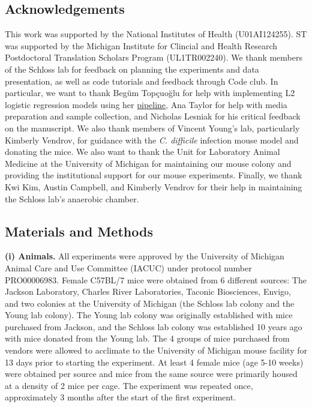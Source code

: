 \documentclass[11pt,]{article}
\begin{document}
\newpage

\subsection{Acknowledgements}\label{acknowledgements}

This work was supported by the National Institutes of Health
(U01AI124255). ST was supported by the Michigan Institute for Clincial
and Health Research Postdoctoral Translation Scholars Program
(UL1TR002240). We thank members of the Schloss lab for feedback on
planning the experiments and data presentation, as well as code
tutorials and feedback through Code club. In particular, we want to
thank Begüm Topçuoğlu for help with implementing L2 logistic regression
models using her
\href{https://github.com/SchlossLab/ML_pipeline_microbiome}{pipeline},
Ana Taylor for help with media preparation and sample collection, and
Nicholas Lesniak for his critical feedback on the manuscript. We also
thank members of Vincent Young's lab, particularly Kimberly Vendrov, for
guidance with the \emph{C. difficile} infection mouse model and donating
the mice. We also want to thank the Unit for Laboratory Animal Medicine
at the University of Michigan for maintaining our mouse colony and
providing the institutional support for our mouse experiments. Finally,
we thank Kwi Kim, Austin Campbell, and Kimberly Vendrov for their help
in maintaining the Schloss lab's anaerobic chamber.

\newpage

\subsection{Materials and Methods}\label{materials-and-methods}

\textbf{(i) Animals.} All experiments were approved by the University of
Michigan Animal Care and Use Committee (IACUC) under protocol number
PRO00006983. Female C57BL/7 mice were obtained from 6 different sources:
The Jackson Laboratory, Charles River Laboratories, Taconic Biosciences,
Envigo, and two colonies at the University of Michigan (the Schloss lab
colony and the Young lab colony). The Young lab colony was originally
established with mice purchased from Jackson, and the Schloss lab colony
was established 10 years ago with mice donated from the Young lab. The 4
groups of mice purchased from vendors were allowed to acclimate to the
University of Michigan mouse facility for 13 days prior to starting the
experiment. At least 4 female mice (age 5-10 weeks) were obtained per
source and mice from the same source were primarily housed at a density
of 2 mice per cage. The experiment was repeated once, approximately 3
months after the start of the first experiment.
\end{document}
